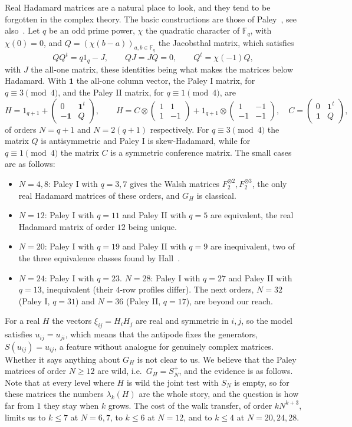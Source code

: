 \documentclass[11pt]{amsart}
\theoremstyle{definition}
\theoremstyle{remark}
\theoremstyle{plain}
\numberwithin{equation}{section}
\numberwithin{table}{section}
\newcommand{\F}{\mathbb F}
\begin{document}
Real Hadamard matrices are a natural place to look, and they tend to be forgotten in the complex theory. The basic constructions are those of Paley~\cite{pa}, see also~\cite{bha}. Let $q$ be an odd prime power, $\chi$ the quadratic character of $\F_q$, with $\chi(0)=0$, and $Q=(\chi(b-a))_{a,b\in\F_q}$ the Jacobsthal matrix, which satisfies
\[
QQ^t=q1_q-J,\qquad QJ=JQ=0,\qquad Q^t=\chi(-1)Q,
\]
with $J$ the all-one matrix, these identities being what makes the matrices below Hadamard. With $\mathbf 1$ the all-one column vector, the Paley I matrix, for $q\equiv3\pmod4$, and the Paley II matrix, for $q\equiv1\pmod4$, are
\[
H=1_{q+1}+\begin{pmatrix}0&\mathbf 1^t\\-\mathbf 1&Q\end{pmatrix},\qquad
H=C\otimes\begin{pmatrix}1&1\\1&-1\end{pmatrix}+1_{q+1}\otimes\begin{pmatrix}1&-1\\-1&-1\end{pmatrix},\quad C=\begin{pmatrix}0&\mathbf 1^t\\\mathbf 1&Q\end{pmatrix},
\]
of orders $N=q+1$ and $N=2(q+1)$ respectively.
For $q\equiv3\pmod4$ the matrix $Q$ is antisymmetric and Paley I is skew-Hadamard, while for $q\equiv1\pmod4$ the matrix $C$ is a symmetric conference matrix. The small cases are as follows:
\begin{itemize}
\item $N=4,8$: Paley I with $q=3,7$ gives the Walsh matrices $F_2^{\otimes2},F_2^{\otimes3}$, the only real Hadamard matrices of these orders, and $G_H$ is classical.
\item $N=12$: Paley I with $q=11$ and Paley II with $q=5$ are equivalent, the real Hadamard matrix of order $12$ being unique.
\item $N=20$: Paley I with $q=19$ and Paley II with $q=9$ are inequivalent, two of the three equivalence classes found by Hall~\cite{hal}.
\item $N=24$: Paley I with $q=23$. $N=28$: Paley I with $q=27$ and Paley II with $q=13$, inequivalent (their $4$-row profiles differ). The next orders, $N=32$ (Paley I, $q=31$) and $N=36$ (Paley II, $q=17$), are beyond our reach.
\end{itemize}
For a real $H$ the vectors $\xi_{ij}=H_iH_j$ are real and symmetric in $i,j$, so the model satisfies $u_{ij}=u_{ji}$, which means that the antipode fixes the generators, $S(u_{ij})=u_{ij}$, a feature without analogue for genuinely complex matrices. Whether it says anything about $G_H$ is not clear to us. We believe that the Paley matrices of order $N\ge12$ are wild, i.e.\ $G_H=S_N^+$, and the evidence is as follows. Note that at every level where $H$ is wild the joint test with $S_N$ is empty, so for these matrices the numbers $\lambda_k(H)$ are the whole story, and the question is how far from $1$ they stay when $k$ grows. The cost of the walk transfer, of order $kN^{k+3}$, limits us to $k\le7$ at $N=6,7$, to $k\le6$ at $N=12$, and to $k\le4$ at $N=20,24,28$.
\end{document}
